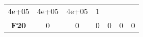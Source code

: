 \documentclass[12pt,a4paper]{article}
\begin{document}
\begin{longtable}[c]{@{}ccccccc@{}}
\begin{minipage}[t]{0.09\columnwidth}\centering\strut
4e+05
\strut\end{minipage} &
\begin{minipage}[t]{0.10\columnwidth}\centering\strut
4e+05
\strut\end{minipage} &
\begin{minipage}[t]{0.11\columnwidth}\centering\strut
4e+05
\strut\end{minipage} &
\begin{minipage}[t]{0.07\columnwidth}\centering\strut
1
\strut\end{minipage}\tabularnewline
\begin{minipage}[t]{0.11\columnwidth}\centering\strut
\textbf{F20}
\strut\end{minipage} &
\begin{minipage}[t]{0.08\columnwidth}\centering\strut
0
\strut\end{minipage} &
\begin{minipage}[t]{0.08\columnwidth}\centering\strut
0
\strut\end{minipage} &
\begin{minipage}[t]{0.09\columnwidth}\centering\strut
0
\strut\end{minipage} &
\begin{minipage}[t]{0.10\columnwidth}\centering\strut
0
\strut\end{minipage} &
\begin{minipage}[t]{0.11\columnwidth}\centering\strut
0
\strut\end{minipage} &
\begin{minipage}[t]{0.07\columnwidth}\centering\strut
0
\strut\end{minipage}\tabularnewline
\bottomrule
\end{longtable}
\end{document}
